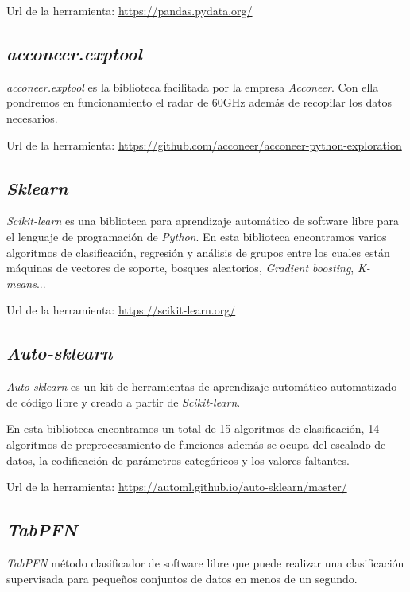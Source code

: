 Url de la herramienta: \url{https://pandas.pydata.org/}

\subsection{\textit{acconeer.exptool}}

\textit{acconeer.exptool} es la biblioteca facilitada por la empresa \textit{Acconeer}. Con ella pondremos en funcionamiento el radar de 60GHz además de recopilar los datos necesarios.

Url de la herramienta: \url{https://github.com/acconeer/acconeer-python-exploration}


\subsection{\textit{Sklearn}}

\textit{Scikit-learn} es una biblioteca para aprendizaje automático de software libre para el lenguaje de programación de \textit{Python}.
En esta biblioteca encontramos varios algoritmos de clasificación, regresión y análisis de grupos entre los cuales están máquinas de vectores de soporte, bosques aleatorios, \textit{Gradient boosting}, \textit{K-means}...

Url de la herramienta: \url{https://scikit-learn.org/}

\subsection{\textit{Auto-sklearn}}

\textit{Auto-sklearn} es un kit de herramientas de aprendizaje automático automatizado de código libre y creado a partir de \textit{Scikit-learn}.

En esta biblioteca encontramos un total de 15 algoritmos de clasificación, 14 algoritmos de preprocesamiento de funciones además se ocupa del escalado de datos, la codificación de parámetros categóricos y los valores faltantes.

Url de la herramienta: \url{https://automl.github.io/auto-sklearn/master/}

\subsection{\textit{TabPFN}}

\textit{TabPFN} método clasificador de software libre que puede realizar una clasificación supervisada para pequeños conjuntos de datos en menos de un segundo.

